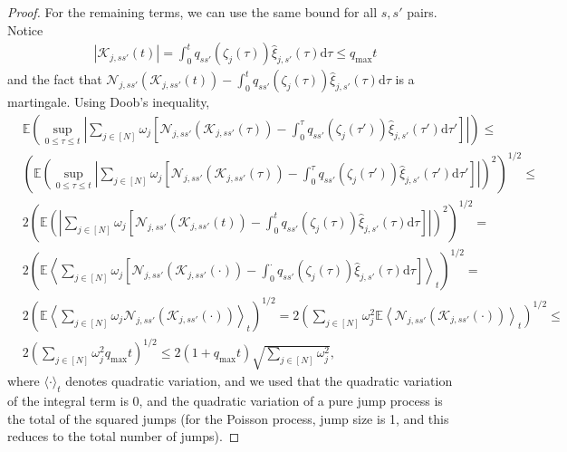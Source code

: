 \documentclass{article}
\newcommand{\E}{\mathbb{E}}
\renewcommand{\d}{\mathrm{d}}
\newcommand{\1}[1]{{\mathds{1}}_{\left\{#1\right\}}}
\begin{document}
{\begin{proof}
		For the remaining terms, we can use the same bound for all $s,s'$  pairs. Notice
		\begin{align*}
			\left|\mathcal{K}_{j,ss'}(t) \right|=\int_{0}^{t}q_{ss'} \left( \zeta_{j}(\tau)\right) \hat{\xi}_{j,s'}(\tau) \d \tau \leq q_{\textrm{max}}t
		\end{align*}
		and the fact that $\mathcal{N}_{j,ss'}\left(\mathcal{K}_{j,ss'}(t) \right) -\int_{0}^{t}q_{ss'} \left( \zeta_{j}(\tau)\right) \hat{\xi}_{j,s'}(\tau) \d \tau $ is a martingale. Using Doob's inequality,
		\begin{align*}
			&\E \left( \sup_{0 \leq \tau \leq t} \left| \sum_{j \in [N]}\omega_j \left[ \mathcal{N}_{j,ss'}\left(\mathcal{K}_{j,ss'}(\tau) \right) -\int_{0}^{\tau}q_{ss'} \left( \zeta_{j}(\tau')\right) \hat{\xi}_{j,s'}(\tau') \d \tau' \right] \right| \right) \leq \\
			&\left(\E\left( \sup_{0 \leq \tau \leq t} \left| \sum_{j \in [N]}\omega_j \left[ \mathcal{N}_{j,ss'}\left(\mathcal{K}_{j,ss'}(\tau) \right) -\int_{0}^{\tau}q_{ss'} \left( \zeta_{j}(\tau')\right) \hat{\xi}_{j,s'}(\tau') \d \tau' \right] \right|\right)^2   \right)^{1/2}\leq\\
			&2\left(\E\left( \left| \sum_{j \in [N]}\omega_j \left[ \mathcal{N}_{j,ss'}\left(\mathcal{K}_{j,ss'}(t) \right) -\int_{0}^{t}q_{ss'} \left( \zeta_{j}(\tau)\right) \hat{\xi}_{j,s'}(\tau) \d \tau \right] \right|\right)^2 \right)^{1/2}=\\
			& 2\left(\E \left\langle\sum_{j \in [N]}\omega_j \left[ \mathcal{N}_{j,ss'}\left(\mathcal{K}_{j,ss'}(\cdot) \right) -\int_{0}^{\cdot}q_{ss'} \left( \zeta_{j}(\tau)\right) \hat{\xi}_{j,s'}(\tau) \d \tau \right] \right\rangle_{\!\! t}\right)^{1/2}=\\
			& 2\left(\E\left\langle\sum_{j \in [N]}\omega_j \mathcal{N}_{j,ss'}\left(\mathcal{K}_{j,ss'}(\cdot) \right) \right\rangle_{\!\! t}\right)^{1/2}=
			2\left(\sum_{j \in [N]}\omega_j^2 \E\left\langle\mathcal{N}_{j,ss'}\left(\mathcal{K}_{j,ss'}(\cdot) \right) \right\rangle_{t}\right)^{1/2}\leq\\
			& 2\left(\sum_{j \in [N]}\omega_j^2 q_{\max}t\right)^{1/2}\leq
			2(1+ q_{\max}t)\sqrt{\sum_{j \in [N]}\omega_j^2},
		\end{align*}
		where $\langle\cdot\rangle_t$ denotes quadratic variation, and we used that the quadratic variation of the integral term is $0$, and the quadratic variation of a pure jump process is the total of the squared jumps (for the Poisson process, jump size is 1, and this reduces to the total number of jumps).
		

\end{proof}}
\end{document}
